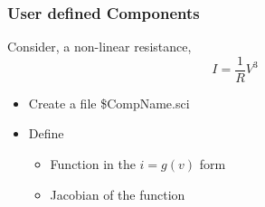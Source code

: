 \documentclass{beamer}
\begin{document}
\begin{frame}
\frametitle{User defined Components}
Consider, a non-linear resistance,
$$I=\frac{1}{R}V^3$$

\begin{itemize}
\item Create  a file \$CompName.sci
\item Define
\begin{itemize}
\item Function in the $i=g(v)$ form
\item Jacobian of the function
\end{itemize}
\end{itemize}

\end{frame}
\end{document}
